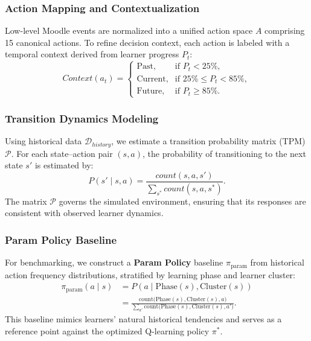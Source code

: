 \documentclass[conference]{IEEEtran}
\begin{document}
\subsubsection{Action Mapping and Contextualization}
Low-level Moodle events are normalized into a unified action space $A$ comprising 15 canonical actions. To refine decision context, each action is labeled with a temporal context derived from learner progress $P_t$:
\begin{equation}
Context(a_t) =
\begin{cases} 
\text{Past}, & \text{if } P_t < 25\%, \\
\text{Current}, & \text{if } 25\% \le P_t < 85\%, \\
\text{Future}, & \text{if } P_t \ge 85\%.
\end{cases}
\end{equation}

\subsubsection{Transition Dynamics Modeling}
Using historical data $\mathcal{D}_{history}$, we estimate a transition probability matrix (TPM) $\mathcal{P}$. For each state--action pair $(s, a)$, the probability of transitioning to the next state $s'$ is estimated by:
\begin{equation}
P(s' \mid s, a) = \frac{count(s, a, s')}{\sum_{s^*} count(s, a, s^*)}.
\end{equation}
The matrix $\mathcal{P}$ governs the simulated environment, ensuring that its responses are consistent with observed learner dynamics.

\subsubsection{Param Policy Baseline}
For benchmarking, we construct a \textbf{Param Policy} baseline $\pi_{\text{param}}$ from historical action frequency distributions, stratified by learning phase and learner cluster:
\begin{equation}
\begin{aligned}
\pi_{\text{param}}(a \mid s) &= P(a \mid \text{Phase}(s), \text{Cluster}(s)) \\
&= \frac{\text{count}\big(\text{Phase}(s), \text{Cluster}(s), a\big)}
        {\sum_{a'} \text{count}\big(\text{Phase}(s), \text{Cluster}(s), a'\big)}.
\end{aligned}
\end{equation}
This baseline mimics learners’ natural historical tendencies and serves as a reference point against the optimized Q-learning policy $\pi^*$.
\end{document}
